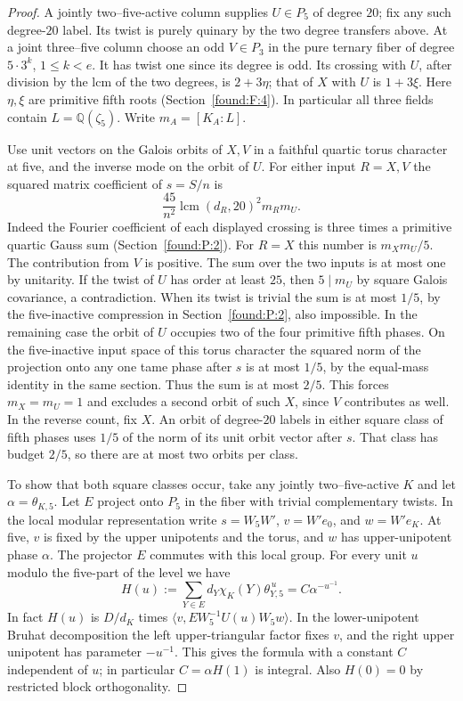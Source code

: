 \documentclass[11pt,a4paper]{article}
\numberwithin{equation}{section}
\theoremstyle{remark}
\newcommand{\QQ}{\mathbb Q}
\begin{document}
\begin{proof}
A jointly two--five-active column supplies $U\in P_5$ of degree $20$;
fix any such degree-$20$ label. Its twist is purely quinary by the two
degree transfers above. At a joint three--five column choose an odd
$V\in P_3$ in the pure ternary fiber of degree $5\cdot3^k$,
$1\le k<e$. It has twist one since its degree is odd. Its crossing
with $U$, after division by the lcm of the two degrees, is $2+3\eta$;
that of $X$ with $U$ is $1+3\xi$. Here $\eta,\xi$ are primitive fifth roots (Section~\ref{found:F:4}). In particular all three fields contain
$L=\QQ(\zeta_5)$. Write $m_A=[K_A:L]$.

Use unit vectors on the Galois orbits of $X,V$ in a faithful quartic
torus character at five, and the inverse mode on the orbit of $U$.
For either input $R=X,V$ the squared matrix coefficient of $s=S/n$ is
\[
      \frac{45}{n^2}\operatorname{lcm}(d_R,20)^2m_Rm_U .
\]
Indeed the Fourier coefficient of each displayed crossing is three times a primitive quartic Gauss sum (Section~\ref{found:P:2}). For $R=X$ this
number is $m_Xm_U/5$. The contribution from $V$ is positive.
The sum over the two inputs is at most one by unitarity. If the twist
of $U$ has order at least $25$, then $5\mid m_U$ by square Galois
covariance, a contradiction. When its twist is trivial the sum is at
most $1/5$, by the five-inactive compression in Section~\ref{found:P:2}, also
impossible. In the remaining case the orbit of $U$ occupies two of the
four primitive fifth phases. On the five-inactive input space of this
torus character the squared norm of the projection onto any one tame
phase after $s$ is at most $1/5$, by the equal-mass identity in the
same section. Thus the sum is at most $2/5$. This forces $m_X=m_U=1$
and excludes a second orbit of such $X$, since $V$ contributes as well.
In the reverse count, fix $X$. An orbit of degree-$20$ labels in either
square class of fifth phases uses $1/5$ of the norm of its unit orbit
vector after $s$. That class has budget $2/5$, so there are at most
two orbits per class.

To show that both square classes occur, take any jointly two--five-active
$K$ and let $\alpha=\theta_{K,5}$. Let $E$ project onto $P_5$ in the
fiber with trivial complementary twists. In the local modular
representation write $s=W_5W'$, $v=W'e_0$, and $w=W'e_K$. At five,
$v$ is fixed by the upper unipotents and the torus, and $w$ has
upper-unipotent phase $\alpha$. The projector $E$ commutes with this
local group. For every unit $u$ modulo the five-part of the level we have
\[
  H(u):=\sum_{Y\in E}d_Y\chi_K(Y)\theta_{Y,5}^{\,u}
       =C\alpha^{-u^{-1}}.
\]
In fact $H(u)$ is $D/d_K$ times
$\langle v,E W_5^{-1}U(u)W_5w\rangle$. In the lower-unipotent Bruhat
decomposition the left upper-triangular factor fixes $v$, and the
right upper unipotent has parameter $-u^{-1}$. This gives the formula
with a constant $C$ independent of $u$; in particular $C=\alpha H(1)$
is integral. Also $H(0)=0$ by restricted block orthogonality.


\end{proof}
\end{document}
